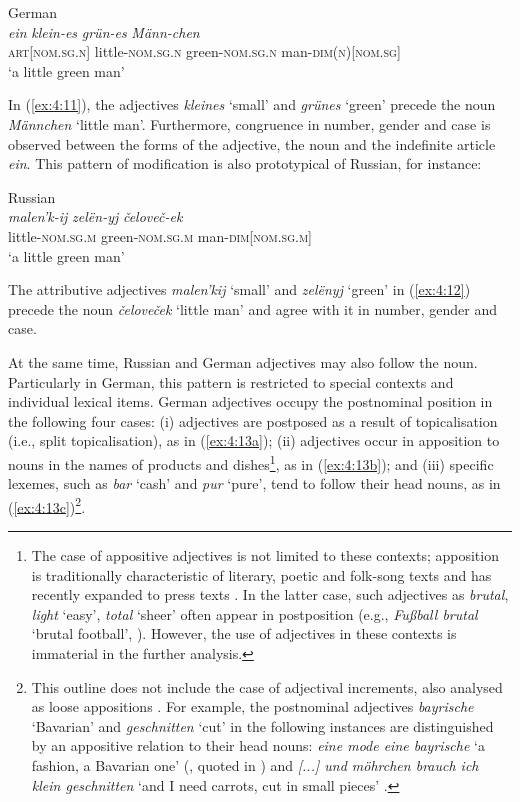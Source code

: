 \ea
\label{ex:4:11}
German \citep[1991]{ids-3-1997}\\
\gll \textit{ein} \textit{klein-es} \textit{grün-es} \textit{Männ-chen}\\
	\textsc{art[nom.sg.n]} little-\textsc{nom.sg.n} green-\textsc{nom.sg.n} man-\textsc{dim}(\textsc{n})[\textsc{nom.sg}]\\
\glt `a little green man'
\z

\noindent In (\ref{ex:4:11}), the adjectives \textit{kleines} `small' and \textit{grünes} `green' precede the noun \textit{Männchen} `little man'. Furthermore, congruence in number, gender and case is observed between the forms of the adjective, the noun and the indefinite article \textit{ein}. This pattern of modification is also prototypical of Russian, for instance: 

\ea
\label{ex:4:12}
Russian\\
\gll \textit{malen'k-ij} \textit{zelën-yj} \textit{čeloveč-ek}\\
	little-\textsc{nom.sg.m} green-\textsc{nom.sg.m} man-\textsc{dim}[\textsc{nom.sg.m}]\\
\glt `a little green man'
\z

\noindent The attributive adjectives \textit{malen'kij} `small' and \textit{zelënyj} `green' in (\ref{ex:4:12}) precede the noun \textit{čeloveček} `little man' and agree with it in number, gender and case. 

At the same time, Russian and German adjectives may also follow the noun. Particularly in German, this pattern is restricted to special contexts and individual lexical items. German adjectives occupy the postnominal position in the following four cases: (i) adjectives are postposed as a result of topicalisation (i.e., split topicalisation), as in (\ref{ex:4:13a}); (ii) adjectives occur in apposition to nouns in the names of products and dishes\footnote{The case of appositive adjectives is not limited to these contexts; apposition is traditionally characteristic of literary, poetic and folk-song texts \citep[cf.][1991]{ids-3-1997} and has recently expanded to press texts \citep{duerscheid-2002}. In the latter case, such adjectives as \textit{brutal}, \textit{light} `easy',  \textit{total} `sheer' often appear in postposition (e.g., \textit{Fußball brutal} `brutal football', \citealt[67]{duerscheid-2002}). However, the use of adjectives in these contexts is immaterial in the further analysis.}, as in (\ref{ex:4:13b}); and (iii) specific lexemes, such as \textit{bar} `cash' and \textit{pur} `pure', tend to follow their head nouns, as in (\ref{ex:4:13c})\footnote{This outline does not include the case of adjectival increments, also analysed as loose appositions \citep[654]{auer-increm}. For example, the postnominal adjectives \textit{bayrische} `Bavarian' and \textit{geschnitten} `cut' in the following instances are distinguished by an appositive relation to their head nouns: \textit{eine mode eine bayrische} `a fashion, a Bavarian one' (\citealt[103]{schroeder-1997}, quoted in \citealt[142]{schwitalla-2006}) and \textit{[...] und möhrchen brauch ich klein geschnitten} `and I need carrots, cut in small pieces' \citep[654]{auer-increm}.}.

